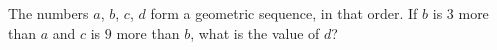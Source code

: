 The numbers $a$, $b$, $c$, $d$ form a geometric sequence, in that order. If $b$ is $3$ more than $a$ and $c$ is $9$ more than $b$, what is the value of $d$?
